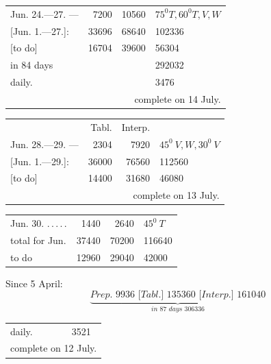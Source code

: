\begin{center}
\begin{tabular}{@{}p{.36\linewidth}rrl@{}}
Jun. 24.—27. \BJournalDay{☿}—\BJournalDay{♄}&7200&10560&\(\mathit{75}^0 T,\mathit{60}^0 T,V,W\)\\
\hfill [Jun. 1.—27.]:&33696&68640&102336\\
\hfill [to do]&16704&39600&56304\\
\hfill in 84 days&&&292032\\
\hfill daily.&&&3476\\
\multicolumn{4}{r}{complete on 14 July.}\\
\hline
\end{tabular}
\end{center}
\begin{center}
\begin{tabular}{@{}p{.36\linewidth}rrl@{}}
&Tabl.&Interp.&\\
Jun. 28.—29. \BJournalDay{☉}—\BJournalDay{☾}&2304&7920&\(\mathit{45}^0\ V,W,\mathit{30}^0\ V\)\\
\hfill [Jun. 1.—29.]:&36000&76560&112560\\
\hfill [to do]&14400&31680&46080\\
\multicolumn{4}{r}{complete on 13 July.}\\
\hline
\end{tabular}
\end{center}
\begin{center}
\begin{tabular}{@{}p{.36\linewidth}rrl@{}}
Jun. 30. \BJournalDay{♂}\nobreak\hspace{.2em}\mbox{.\,.\,.\,.\,.}\hfill&1440&2640&\(\mathit{45}^0\ T\)\\
\hfill total for Jun.&37440&70200&116640\\
\hfill to do&12960&29040&42000
\end{tabular}
\end{center}
\noindent Since 5 April:
\[
\underbrace{\textit{Prep. 9936 [Tabl.] 135360 [Interp.] 161040}}_{\textstyle\textit{in 87 days 306336}}
\]
\begin{center}
\begin{tabular}{@{}p{.36\linewidth}rrl@{}}
\hfill daily.&&&3521\\
\multicolumn{4}{r}{complete on 12 July.}\\
\hline
\end{tabular}
\end{center}
